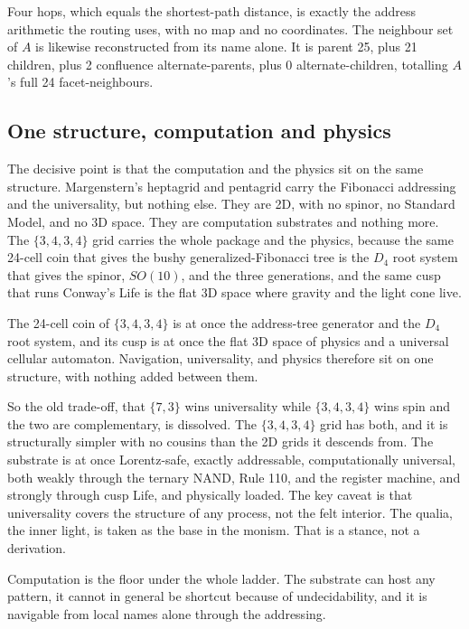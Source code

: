 Four hops, which equals the shortest-path distance, is exactly the address arithmetic the routing uses, with no map and no coordinates. The neighbour set of $A$ is likewise reconstructed from its name alone. It is parent 25, plus 21 children, plus 2 confluence alternate-parents, plus 0 alternate-children, totalling $A$'s full 24 facet-neighbours.

\subsection{One structure, computation and physics}

The decisive point is that the computation and the physics sit on the same structure. Margenstern's heptagrid and pentagrid carry the Fibonacci addressing and the universality, but nothing else. They are 2D, with no spinor, no Standard Model, and no 3D space. They are computation substrates and nothing more. The $\{3,4,3,4\}$ grid carries the whole package and the physics, because the same 24-cell coin that gives the bushy generalized-Fibonacci tree is the $D_4$ root system that gives the spinor, $SO(10)$, and the three generations, and the same cusp that runs Conway's Life is the flat 3D space where gravity and the light cone live.

\begin{principle}
The 24-cell coin of $\{3,4,3,4\}$ is at once the address-tree generator and the $D_4$ root system, and its cusp is at once the flat 3D space of physics and a universal cellular automaton. Navigation, universality, and physics therefore sit on one structure, with nothing added between them.
\end{principle}

So the old trade-off, that $\{7,3\}$ wins universality while $\{3,4,3,4\}$ wins spin and the two are complementary, is dissolved. The $\{3,4,3,4\}$ grid has both, and it is structurally simpler with no cousins than the 2D grids it descends from. The substrate is at once Lorentz-safe, exactly addressable, computationally universal, both weakly through the ternary NAND, Rule 110, and the register machine, and strongly through cusp Life, and physically loaded. The key caveat is that universality covers the structure of any process, not the felt interior. The qualia, the inner light, is taken as the base in the monism. That is a stance, not a derivation.

Computation is the floor under the whole ladder. The substrate can host any pattern, it cannot in general be shortcut because of undecidability, and it is navigable from local names alone through the addressing.
